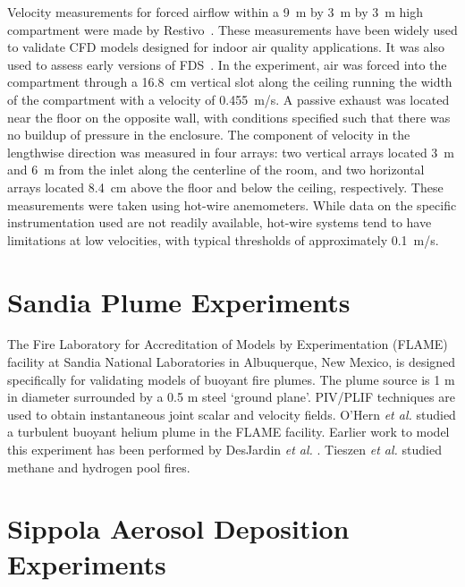 Velocity measurements for forced airflow within a 9~m by 3~m by 3~m high compartment were made by Restivo~\cite{Restivo:1979}. These measurements
have been widely used to validate CFD models designed for indoor air quality applications. It was also used to assess early versions of
FDS~\cite{Emmerich:1,Emmerich:2,Musser:1}. In the experiment, air was forced into the compartment through a 16.8~cm vertical slot along the ceiling
running the width of the compartment with a velocity of 0.455~m/s. A passive exhaust was located near the floor on the opposite wall, with
conditions specified such that there was no buildup of pressure in the enclosure. The component
of velocity in the lengthwise direction was measured in four arrays: two vertical arrays located 3~m and 6~m  from the inlet along the
centerline of the room, and two horizontal arrays located 8.4~cm above the floor and below the ceiling, respectively.
These measurements were taken using hot-wire anemometers. While data on the specific
instrumentation used are not readily available, hot-wire systems tend to have limitations at low velocities,
with typical thresholds of approximately 0.1~m/s.

\section{Sandia Plume Experiments}

The Fire Laboratory for Accreditation of Models by Experimentation (FLAME) facility \cite{OHern:2005,Blanchat:2001} at Sandia National Laboratories in Albuquerque, New Mexico, is designed specifically for validating models of buoyant fire plumes.  The plume source is 1 m in diameter surrounded by a 0.5 m steel `ground plane'. PIV/PLIF techniques are used to obtain instantaneous joint scalar and velocity fields.  O'Hern {\em et al.} \cite{OHern:2005} studied a turbulent buoyant helium plume in the FLAME facility. Earlier work to model this experiment has been performed by DesJardin {\em et al.} \cite{DesJardin:2004}. Tieszen {\em et al.} \cite{Tieszen:2004,Tieszen:2002} studied methane and hydrogen pool fires.

\section{Sippola Aerosol Deposition Experiments}

